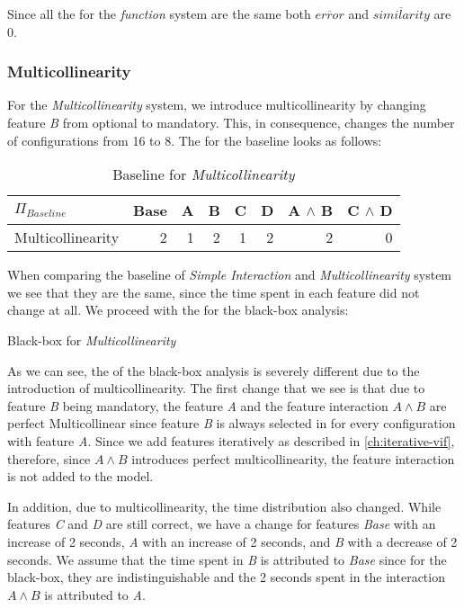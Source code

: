 Since all the {\perfInfluenceModel} for the \emph{function} system are the same both $\overline{error}$ and $\overline{similarity}$ 
are 0.

\subsubsection*{Multicollinearity}
For the \emph{Multicollinearity} system, we introduce multicollinearity by changing feature \emph{B} from optional to mandatory. 
This, in consequence, changes the number of configurations from 16 to 8. The {\perfInfluenceModel} for the baseline looks as follows:

\begin{table}[H]
    \centering
    \begin{tabular}{lrrrrrrr}   
    \toprule
    $\Pi_{Baseline}$    & Base & A & B & C & D & A $\land$ B & C $\land$ D  \\
    \midrule
    Multicollinearity &   2 &  1 &  2 &  1 &  2 &   2 &  0 \\
    \bottomrule
    \end{tabular}
    \caption{Baseline {\perfInfluenceModel} for \emph{Multicollinearity}}
\end{table}

When comparing the baseline {\perfInfluenceModel} of \emph{Simple Interaction} and \emph{Multicollinearity} system 
we see that they are the same, since the time spent in each feature did not change at all. We proceed with 
the {\perfInfluenceModel} for the black-box analysis:

\begin{table}[H]
    \centering
    
    \caption{Black-box {\perfInfluenceModel} for \emph{Multicollinearity}}
\end{table}

As we can see, the {\perfInfluenceModel} of the black-box analysis is severely different due to the introduction of multicollinearity. 
The first change that we see is that due to feature \emph{B} being mandatory, 
the feature \emph{A} and the feature interaction $A \land B$ are perfect Multicollinear since feature \emph{B} 
is always selected in for every configuration with feature \emph{A}. Since we add features iteratively 
as described in \autoref{ch:iterative-vif}, therefore, since $A \land B$ introduces perfect multicollinearity, 
the feature interaction is not added to the model. 

In addition, due to multicollinearity, the time distribution also changed. While features \emph{C} and \emph{D} are still correct, 
we have a change for features \emph{Base} with an increase of 2 seconds, 
\emph{A} with an increase of 2 seconds, and \emph{B} with a decrease of 2 seconds. 
We assume that the time spent in \emph{B} is attributed to \emph{Base} since for the black-box, 
they are indistinguishable and the 2 seconds spent in the interaction $A \land B$ is attributed to \emph{A}.

